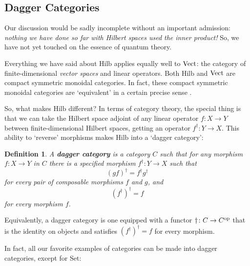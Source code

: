 \documentclass[12pt]{article}
\newtheorem{definition}[thm]{Definition}
\newcommand{\Hilb}{\mathrm{Hilb}}
\newcommand{\Set}{\mathrm{Set}}
\newcommand{\Vect}{{\rm Vect}}
\newcommand{\maps}{\colon}
\newcommand{\op}{{\rm op}}
\begin{document}
\subsection{Dagger Categories}
\label{dagger}

Our discussion would be sadly incomplete without an important
admission: {\it nothing we have done so far with Hilbert spaces 
used the inner product!}   So, we have not yet touched on
the essence of quantum theory.

Everything we have said about $\Hilb$ applies equally well to $\Vect$:
the category of finite-dimensional {\it vector spaces} and linear
operators.  Both $\Hilb$ and $\Vect$ are compact symmetric monoidal
categories.  In fact, these compact symmetric monoidal categories are
`equivalent' in a certain precise sense \cite{MacLane2}.

So, what makes $\Hilb$ different?  In terms of category theory, the
special thing is that we can take the Hilbert space adjoint of any 
linear operator $f \maps X \to Y$ between finite-dimensional Hilbert 
spaces, getting an operator $f^\dagger \maps Y \to X$.  This ability 
to `reverse' morphisms makes $\Hilb$ into a `dagger category':

\begin{definition}
A {\bf dagger category} is a category $C$ such that for any morphism
$f \maps X \to Y$ in $C$ there is a specified morphism $f^\dagger \maps 
Y \to X$ such that
\[  (gf)^\dagger = f^\dagger g^\dagger  \]
for every pair of composable morphisms $f$ and $g$, and 
\[       (f^\dagger)^\dagger = f  \]
for every morphism $f$.
\end{definition}
Equivalently, a dagger category is one
equipped with a functor $\dagger \maps C \to C^\op$ 
that is the identity on objects and satisfies 
$(f^\dagger)^\dagger = f$ for every morphism.

In fact, all our favorite examples of categories can be made into
dagger categories, except for $\Set$:
\end{document}
